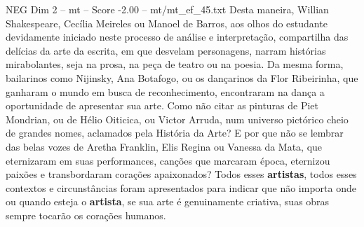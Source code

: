 \begin{textsample}{NEG Dim 2 – mt – Score -2.00 – mt/mt\_ef\_45.txt}
Desta maneira, Willian Shakespeare, Cecília Meireles ou Manoel de Barros, aos olhos do estudante devidamente iniciado neste processo de análise e interpretação, compartilha das delícias da arte da escrita, em que desvelam personagens, narram histórias mirabolantes, seja na prosa, na peça de teatro ou na poesia.
Da mesma forma, bailarinos como Nijinsky, Ana Botafogo, ou os dançarinos da Flor Ribeirinha, que ganharam o mundo em busca de reconhecimento, encontraram na dança a oportunidade de apresentar sua arte.
Como não citar as pinturas de Piet Mondrian, ou de Hélio Oiticica, ou Victor Arruda, num universo pictórico cheio de grandes nomes, aclamados pela História da Arte?
E por que não se lembrar das belas vozes de Aretha Franklin, Elis Regina ou Vanessa da Mata, que eternizaram em suas performances, canções que marcaram época, eternizou paixões e transbordaram corações apaixonados?
Todos esses \textbf{artistas}, todos esses contextos e circunstâncias foram apresentados para indicar que não importa onde ou quando esteja o \textbf{artista}, se sua arte é genuinamente criativa, suas obras sempre tocarão os corações humanos.

\end{textsample}
